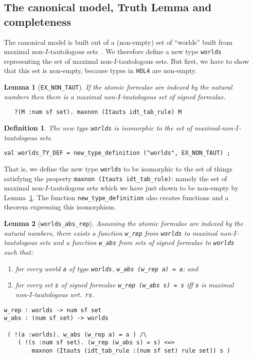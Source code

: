 \documentclass[a4paper]{article}
\newtheorem{lemma}{Lemma}
\newtheorem{definition}{Definition}
\newcommand{\hol}{\texttt{HOL4}}
\begin{document}
\subsection{The canonical model, Truth Lemma and completeness}

The canonical model is built out of a (non-empty) set of ``worlds''
built from maximal non-$I$-tautologous
sets~\cite[just above Theorem~3]{fitting-dual-tableau}. We therefore define a new type
\texttt{worlds} representing the set of maximal non-$I$-tautologous
sets. But first, we have to show that this set is non-empty, because
types in \hol{} are non-empty.

\begin{lemma}[\texttt{EX\_NON\_TAUT}]\label{EX-NON-TAUT}
If the atomic formulae are indexed by the natural numbers
then there is a maximal non-$I$-tautologous set of signed formulae.
\begin{verbatim}
   ?(M :num sf set). maxnon (Itauts idt_tab_rule) M
\end{verbatim}
\end{lemma}

\begin{definition}
  The new type \texttt{worlds} is isomorphic to the set of 
  maximal-non-$I$-tautologous sets.
\begin{verbatim}
val worlds_TY_DEF = new_type_definition ("worlds", EX_NON_TAUT) ;
\end{verbatim}
\end{definition}

That is, we define the new type \texttt{worlds} to be isomorphic to
the set of things satisfying the property \texttt{maxnon (Itauts
  idt\_tab\_rule)}: namely the set of maximal non-$I$-tautologous sets
which we have just shown to be non-empty by
Lemma~\ref{EX-NON-TAUT}.
%
The function \texttt{new\_type\_definition} also creates functions
and a theorem expressing this isomorphism.

\begin{lemma}[\texttt{worlds\_abs\_rep}]
Assuming the atomic formulae are indexed by the natural numbers,
there exists a function \texttt{w\_rep} from \texttt{worlds} to 
maximal non-$I$-tautologous sets 
and a function \texttt{w\_abs} from 
sets of signed formulae to \texttt{worlds} such that:
\begin{enumerate}
\item for every world \texttt{a} of type \texttt{worlds}, \texttt{w\_abs
    (w\_rep a) = a}; and
\item for every set \texttt{s} of signed formulae 
  \texttt{w\_rep (w\_abs s) = s} iff \texttt{s} is
  maximal non-$I$-tautologous wrt.\ \texttt{rs}.
\end{enumerate}
\begin{verbatim}
w_rep : worlds -> num sf set
w_abs : (num sf set) -> worlds

 ( !(a :worlds). w_abs (w_rep a) = a ) /\ 
    ( !(s :num sf set). (w_rep (w_abs s) = s) <=> 
        maxnon (Itauts (idt_tab_rule :(num sf set) rule set)) s )
\end{verbatim}
\end{lemma}
\end{document}

